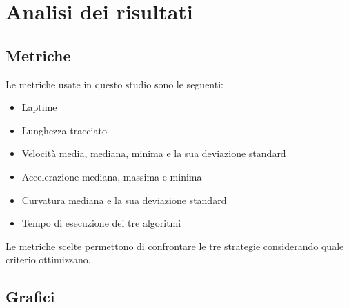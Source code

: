 
\chapter{Analisi dei risultati}

\section{Metriche}
Le metriche usate in questo studio sono le seguenti:
\begin{itemize}
	\item Laptime 
	\item Lunghezza tracciato 
	\item Velocità media, mediana, minima e la sua deviazione standard
	\item Accelerazione mediana, massima e minima
	\item Curvatura mediana e la sua deviazione standard
	\item Tempo di esecuzione dei tre algoritmi
\end{itemize}
Le metriche scelte permettono di confrontare le tre strategie considerando quale criterio 
ottimizzano.

\section{Grafici}
